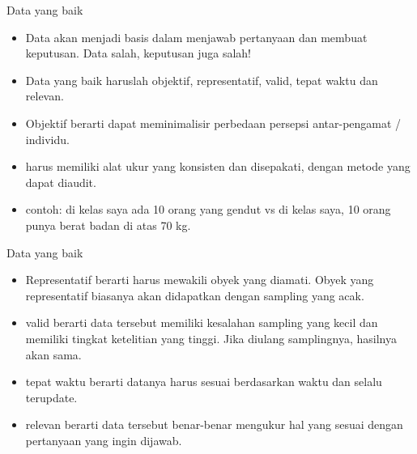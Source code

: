 \documentclass[
  ignorenonframetext,
]{beamer}
\begin{document}
\begin{frame}{Data yang baik}
\label{data-yang-baik}
\begin{itemize}
\item
  Data akan menjadi basis dalam menjawab pertanyaan dan membuat
  keputusan. Data salah, keputusan juga salah!
\item
  Data yang baik haruslah objektif, representatif, valid, tepat waktu
  dan relevan.
\item
  Objektif berarti dapat meminimalisir perbedaan persepsi antar-pengamat
  / individu.
\item
  harus memiliki alat ukur yang konsisten dan disepakati, dengan metode
  yang dapat diaudit.
\item
  contoh: di kelas saya ada 10 orang yang gendut vs di kelas saya, 10
  orang punya berat badan di atas 70 kg.
\end{itemize}
\end{frame}

\begin{frame}{Data yang baik}
\label{data-yang-baik-1}
\begin{itemize}
\item
  Representatif berarti harus mewakili obyek yang diamati. Obyek yang
  representatif biasanya akan didapatkan dengan sampling yang acak.
\item
  valid berarti data tersebut memiliki kesalahan sampling yang kecil dan
  memiliki tingkat ketelitian yang tinggi. Jika diulang samplingnya,
  hasilnya akan sama.
\item
  tepat waktu berarti datanya harus sesuai berdasarkan waktu dan selalu
  terupdate.
\item
  relevan berarti data tersebut benar-benar mengukur hal yang sesuai
  dengan pertanyaan yang ingin dijawab.
\end{itemize}
\end{frame}
\end{document}
